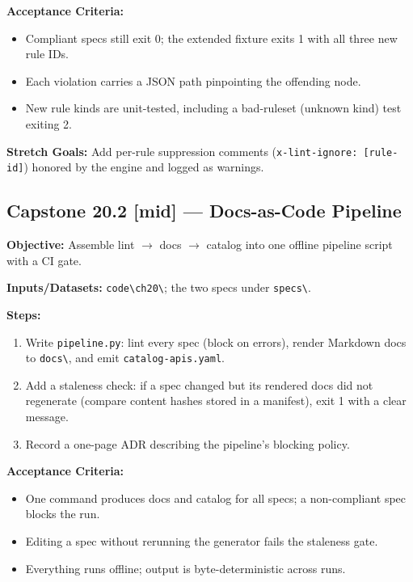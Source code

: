 \textbf{Acceptance Criteria:}
\begin{itemize}
  \item[$\square$] Compliant specs still exit 0; the extended fixture
        exits 1 with all three new rule IDs.
  \item[$\square$] Each violation carries a JSON path pinpointing the
        offending node.
  \item[$\square$] New rule kinds are unit-tested, including a
        bad-ruleset (unknown kind) test exiting 2.
\end{itemize}

\textbf{Stretch Goals:} Add per-rule suppression comments
(\texttt{x-lint-ignore: [rule-id]}) honored by the engine and logged as
warnings.

\subsection*{Capstone 20.2 [mid] --- Docs-as-Code Pipeline}
\textbf{Objective:} Assemble lint $\rightarrow$ docs $\rightarrow$
catalog into one offline pipeline script with a CI gate.

\textbf{Inputs/Datasets:} \texttt{code\textbackslash{}ch20\textbackslash{}};
the two specs under \texttt{specs\textbackslash{}}.

\textbf{Steps:}
\begin{enumerate}
  \item Write \texttt{pipeline.py}: lint every spec (block on errors),
        render Markdown docs to \texttt{docs\textbackslash{}}, and emit
        \texttt{catalog-apis.yaml}.
  \item Add a staleness check: if a spec changed but its rendered docs
        did not regenerate (compare content hashes stored in a manifest),
        exit 1 with a clear message.
  \item Record a one-page ADR describing the pipeline's blocking policy.
\end{enumerate}

\textbf{Acceptance Criteria:}
\begin{itemize}
  \item[$\square$] One command produces docs and catalog for all specs;
        a non-compliant spec blocks the run.
  \item[$\square$] Editing a spec without rerunning the generator fails
        the staleness gate.
  \item[$\square$] Everything runs offline; output is byte-deterministic
        across runs.
\end{itemize}

